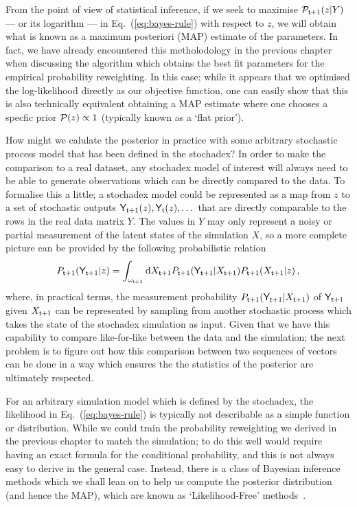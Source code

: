 From the point of view of statistical inference, if we seek to maximise ${\cal P}_{{\sf t}+1}(z \vert Y)$ --- or its logarithm --- in Eq.~(\ref{eq:bayes-rule}) with respect to $z$, we will obtain what is known as a maximum posteriori (MAP) estimate of the parameters. In fact, we have already encountered this metholodology in the previous chapter when discussing the algorithm which obtains the best fit parameters for the empirical probability reweighting. In this case; while it appears that we optimised the log-likelihood directly as our objective function, one can easily show that this is also technically equivalent obtaining a MAP estimate where one chooses a specfic prior ${\cal P} (z) \propto 1$ (typically known as a `flat prior').

How might we calulate the posterior in practice with some arbitrary stochastic process model that has been defined in the stochadex? In order to make the comparison to a real dataset, any stochadex model of interest will always need to be able to generate observations which can be directly compared to the data. To formalise this a little; a stochadex model could be represented as a map from $z$ to a set of stochastic outputs ${\sf Y}_{{\sf t}+1}(z), {\sf Y}_{{\sf t}}(z), \dots$ that are directly comparable to the rows in the real data matrix $Y$. The values in $Y$ may only represent a noisy or partial measurement of the latent states of the simulation $X$, so a more complete picture can be provided by the following probabilistic relation
\begin{align}
P_{{\sf t}+1}({\sf Y}_{{\sf t}+1} \vert z) = \int_{\omega_{{\sf t}+1}}{\rm d}X_{{\sf t}+1} P_{{\sf t}+1}({\sf Y}_{{\sf t}+1} \vert X_{{\sf t}+1} )P_{{\sf t}+1}(X_{{\sf t}+1} \vert z) \label{eq:simulation-measurement} \,,
\end{align}
where, in practical terms, the measurement probability $P_{{\sf t}+1}({\sf Y}_{{\sf t}+1} \vert X_{{\sf t}+1})$ of ${\sf Y}_{{\sf t}+1}$ given $X_{{\sf t}+1}$ can be represented by sampling from another stochastic process which takes the state of the stochadex simulation as input. Given that we have this capability to compare like-for-like between the data and the simulation; the next problem is to figure out how this comparison between two sequences of vectors can be done in a way which ensures the the statistics of the posterior are ultimately respected. 

For an arbitrary simulation model which is defined by the stochadex, the likelihood in Eq.~(\ref{eq:bayes-rule}) is typically not describable as a simple function or distribution. While we could train the probability reweighting we derived in the previous chapter to match the simulation; to do this well would require having an exact formula for the conditional probability, and this is not always easy to derive in the general case. Instead, there is a class of Bayesian inference methods which we shall lean on to help us compute the posterior distribution (and hence the MAP), which are known as `Likelihood-Free' methods~\cite{sisson2018handbook,price2018bayesian,wood2010statistical,drovandi2022comparison}.

